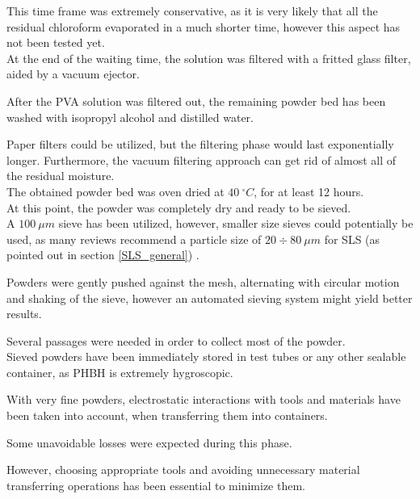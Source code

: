 \documentclass{article}
\begin{document}
        This time frame was extremely conservative, as it is very likely that all the residual chloroform 
        evaporated in a much shorter time, however this aspect has not been tested yet. \\

        At the end of the waiting time, the solution was filtered with a fritted glass filter, aided by a vacuum 
        ejector. 

        After the PVA solution was filtered out, the remaining powder bed has been washed with isopropyl alcohol and 
        distilled water. 

        Paper filters could be utilized, but the filtering phase would last exponentially longer. Furthermore, the vacuum filtering 
        approach can get rid of almost all of the residual moisture. \\ 

        The obtained powder bed was oven dried at $40 \ ^{\circ}C$, for at least 12 hours. \\ 

        At this point, the powder was completely dry and ready to be sieved. \\ 

        A $100 \ \mu m$ sieve has been utilized, however, smaller size sieves could potentially be used, as many reviews recommend a particle 
        size of $20 \div 80 \ \mu m$ for SLS (as pointed out in section \ref{SLS_general}) \autocites{Padovano_SLS_Review}. 
        
        Powders were gently pushed against the mesh, alternating with circular motion and shaking of the sieve, however 
        an automated sieving system might yield better results. 

        Several passages were needed in order to collect most of the powder. \\ 

        Sieved powders have been immediately stored in test tubes or any other sealable container, as PHBH is extremely hygroscopic. 

        With very fine powders, electrostatic interactions with tools and materials have been taken into account, when transferring 
        them into containers. 

        Some unavoidable losses were expected during this phase. 

        However, choosing appropriate tools and avoiding unnecessary material transferring operations has been essential to minimize them. 
\end{document}
